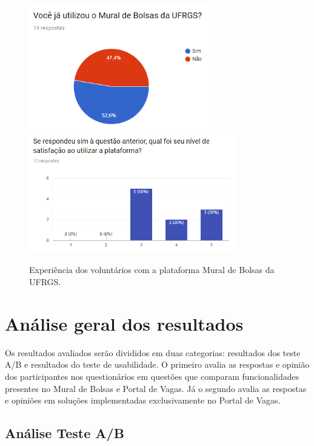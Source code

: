 \begin{figure}[H]
    \caption{Experiência dos voluntários com a plataforma Mural de Bolsas da UFRGS.}
       	\begin{center}
            \includegraphics[width=0.7\textwidth]{figuras/avaliacao/mural-bolsas.png}
            \\
            \includegraphics[width=0.8\textwidth]{figuras/avaliacao/mural-bolsas-2.png}
        \end{center}
    \label{avalGrafMB}
\end{figure}

\section{Análise geral dos resultados}
\label{avaliacaoAnalise}

Os resultados avaliados serão divididos em duas categorias: resultados dos teste A/B e resultados do teste de usabilidade. O primeiro avalia as respostas e opinião dos participantes nos questionários em questões que comparam funcionalidades presentes no Mural de Bolsas e Portal de Vagas. Já o segundo avalia as respostas e opiniões em soluções implementadas exclusivamente no Portal de Vagas.


\subsection{Análise Teste A/B}
\label {avaliacaoAnaliseSubjetiva}

